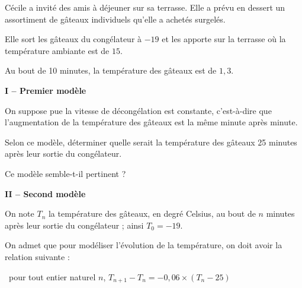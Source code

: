 Cécile a invité des amis à déjeuner sur sa terrasse. Elle a prévu en dessert un assortiment de gâteaux individuels qu'elle a achetés surgelés.

Elle sort les gâteaux du congélateur à $-19$\textcelsius{} et les apporte sur la terrasse où la température ambiante est de $15$\textcelsius.

Au bout de 10 minutes, la température des gâteaux est de $1,3$\textcelsius.

\begin{center}
	\textbf{I -- Premier modèle}
\end{center}

On suppose pue la vitesse de décongélation est constante, c'est-à-dire que l'augmentation de la température des gâteaux est la même minute après minute.

\smallskip

Selon ce modèle, déterminer quelle serait la température des gâteaux 25 minutes après leur sortie du congélateur.

\smallskip

Ce modèle semble-t-il pertinent ?

\begin{center}
	\textbf{II -- Second modèle}
\end{center}

On note $T_n$ la température des gâteaux, en degré Celsius, au bout de $n$ minutes après leur sortie du congélateur ; ainsi $T_0 = -19$.

\smallskip

On admet que pour modéliser l'évolution de la température, on doit avoir la relation suivante :

\smallskip

\hfill~pour tout entier naturel $n$, $T_{n+1}-T_n = -0,06 \times (T_n-25)$\hfill~

